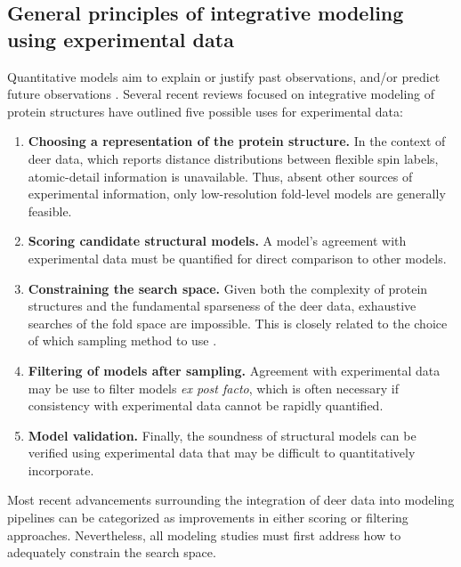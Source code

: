 \subsection{General principles of integrative modeling using experimental data}\label{sec:deerintro_general_integrative}

Quantitative models aim to explain or justify past observations, and/or predict future observations \citep*{Hofman2021}. Several recent reviews focused on integrative modeling of protein structures \citep*{Rout2019, Sali2021} have outlined five possible uses for experimental data: 

\begin{enumerate}
    \item \textbf{Choosing a representation of the protein structure.} In the context of \gls{deer} data, which reports distance distributions between flexible spin labels, atomic-detail information is unavailable. Thus, absent other sources of experimental information, only low-resolution fold-level models are generally feasible.
    \item \textbf{Scoring candidate structural models.} A model's agreement with experimental data must be quantified for direct comparison to other models.
    \item \textbf{Constraining the search space.} Given both the complexity of protein structures and the fundamental sparseness of the \gls{deer} data, exhaustive searches of the fold space are impossible. This is closely related to the choice of which sampling method to use \citep*{Maximova2016}.
    \item \textbf{Filtering of models after sampling.} Agreement with experimental data may be use to filter models \emph{ex post facto}, which is often necessary if consistency with experimental data cannot be rapidly quantified.
    \item \textbf{Model validation.} Finally, the soundness of structural models can be verified using experimental data that may be difficult to quantitatively incorporate.
\end{enumerate}

Most recent advancements surrounding the integration of \gls{deer} data into modeling pipelines can be categorized as improvements in either scoring or filtering approaches. Nevertheless, all modeling studies must first address how to adequately constrain the search space.

